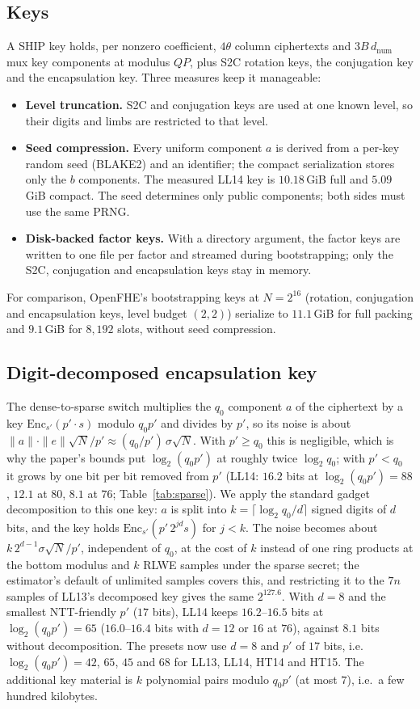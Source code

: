\documentclass[sigconf,nonacm]{acmart}
\newcommand{\lgqp}{\log_2(q_0 p')}
\begin{document}
\subsection{Keys}
\label{sec:keys}
A SHIP key holds, per nonzero coefficient, $4\theta$ column ciphertexts and $3B\,d_{\mathrm{num}}$ mux key components at modulus $QP$, plus S2C rotation keys, the conjugation key and the encapsulation key.
Three measures keep it manageable:
\begin{itemize}
\item \textbf{Level truncation.} S2C and conjugation keys are used at one known level, so their digits and limbs are restricted to that level.
\item \textbf{Seed compression.} Every uniform component $a$ is derived from a per-key random seed (BLAKE2) and an identifier; the compact serialization stores only the $b$ components. The measured LL14 key is $10.18$\,GiB full and $5.09$\,GiB compact. The seed determines only public components; both sides must use the same PRNG.
\item \textbf{Disk-backed factor keys.} With a directory argument, the factor keys are written to one file per factor and streamed during bootstrapping; only the S2C, conjugation and encapsulation keys stay in memory.
\end{itemize}
For comparison, OpenFHE's bootstrapping keys at $N=2^{16}$ (rotation, conjugation and encapsulation keys, level budget $(2,2)$) serialize to $11.1$\,GiB for full packing and $9.1$\,GiB for $8{,}192$ slots, without seed compression.

\subsection{Digit-decomposed encapsulation key}
\label{sec:digits}
The dense-to-sparse switch multiplies the $q_0$ component $a$ of the ciphertext by a key $\mathrm{Enc}_{s'}(p'\cdot s)$ modulo $q_0p'$ and divides by $p'$, so its noise is about $\|a\|\cdot\|e\|\sqrt{N}/p'\approx (q_0/p')\,\sigma\sqrt{N}$.
With $p'\ge q_0$ this is negligible, which is why the paper's bounds put $\lgqp$ at roughly twice $\log_2 q_0$; with $p'<q_0$ it grows by one bit per bit removed from $p'$ (LL14: $16.2$ bits at $\lgqp=88$, $12.1$ at $80$, $8.1$ at $76$; Table~\ref{tab:sparse}).
We apply the standard gadget decomposition to this one key: $a$ is split into $k=\lceil\log_2 q_0/d\rceil$ signed digits of $d$ bits, and the key holds $\mathrm{Enc}_{s'}(p'\,2^{jd}s)$ for $j<k$.
The noise becomes about $k\,2^{d-1}\sigma\sqrt{N}/p'$, independent of $q_0$, at the cost of $k$ instead of one ring products at the bottom modulus and $k$ RLWE samples under the sparse secret; the estimator's default of unlimited samples covers this, and restricting it to the $7n$ samples of LL13's decomposed key gives the same $2^{127.6}$.
With $d=8$ and the smallest NTT-friendly $p'$ ($17$ bits), LL14 keeps $16.2$--$16.5$ bits at $\lgqp=65$ ($16.0$--$16.4$ bits with $d=12$ or $16$ at $76$), against $8.1$ bits without decomposition.
The presets now use $d=8$ and $p'$ of $17$ bits, i.e.\ $\lgqp=42$, $65$, $45$ and $68$ for LL13, LL14, HT14 and HT15.
The additional key material is $k$ polynomial pairs modulo $q_0p'$ (at most $7$), i.e.\ a few hundred kilobytes.
\end{document}
